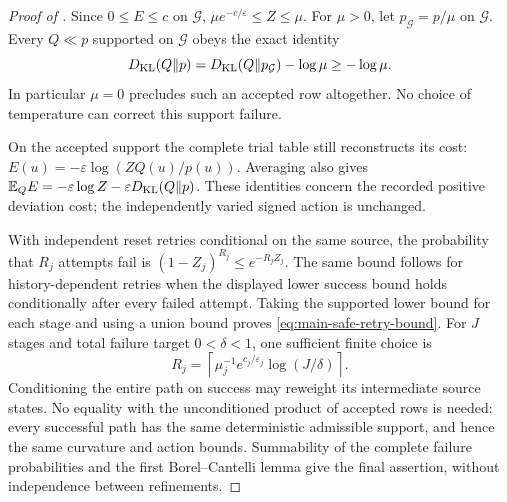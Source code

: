 \documentclass[11pt]{article}
\theoremstyle{definition}
\theoremstyle{remark}
\begin{document}
\begin{proof}[Proof of ]
Since $0\le E\le c$ on $\mathcal G$,
$\mu e^{-c/\varepsilon}\le Z\le\mu$.
For $\mu>0$, let $p_{\mathcal G}=p/\mu$ on $\mathcal G$.  Every
$Q\ll p$ supported on $\mathcal G$ obeys the exact identity
\[
 D_{\rm KL}(Q\Vert p)=D_{\rm KL}(Q\Vert p_{\mathcal G})-\log\mu
       \ge-\log\mu.
\]
In particular $\mu=0$ precludes such an accepted row altogether.
No choice of temperature can correct this support failure.

On the accepted support the complete trial table still reconstructs its cost:
$E(u)=-\varepsilon\log(ZQ(u)/p(u))$.  Averaging also gives
$\mathbb E_QE=-\varepsilon\log Z-
\varepsilon D_{\rm KL}(Q\Vert p)$.  These identities concern the recorded
positive deviation cost; the independently varied signed action is unchanged.

With independent reset retries conditional on the same source, the probability
that $R_j$ attempts fail is $(1-Z_j)^{R_j}\le e^{-R_jZ_j}$.
The same bound follows for history-dependent retries when the displayed lower
success bound holds conditionally after every failed attempt.  Taking the
supported lower bound for each stage and using a union bound proves
\eqref{eq:main-safe-retry-bound}.  For $J$ stages and total failure target
$0<\delta<1$, one sufficient finite choice is
\begin{equation}
 R_j=\left\lceil\mu_j^{-1}e^{c_j/\varepsilon_j}
                         \log(J/\delta)\right\rceil.
 \label{eq:supp-safe-retry-cap}
\end{equation}
Conditioning the entire path on success may reweight its intermediate source
states.  No equality with the unconditioned product of accepted rows is needed:
every successful path has the same deterministic admissible support, and hence
the same curvature and action bounds.  Summability of the complete failure
probabilities and the first Borel--Cantelli lemma give the final assertion,
without independence between refinements.
\end{proof}
\end{document}
